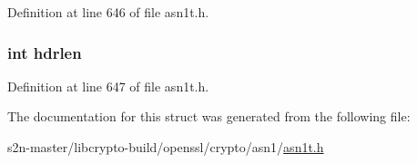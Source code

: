Definition at line 646 of file asn1t.\+h.

\subsubsection[{\texorpdfstring{hdrlen}{hdrlen}}]{\setlength{\rightskip}{0pt plus 5cm}int hdrlen}\hypertarget{struct_a_s_n1___t_l_c__st_aba689c8df7cf733548a05ee5c649fd79}{}\label{struct_a_s_n1___t_l_c__st_aba689c8df7cf733548a05ee5c649fd79}


Definition at line 647 of file asn1t.\+h.



The documentation for this struct was generated from the following file\+:\begin{DoxyCompactItemize}
\item 
s2n-\/master/libcrypto-\/build/openssl/crypto/asn1/\hyperlink{crypto_2asn1_2asn1t_8h}{asn1t.\+h}\end{DoxyCompactItemize}
